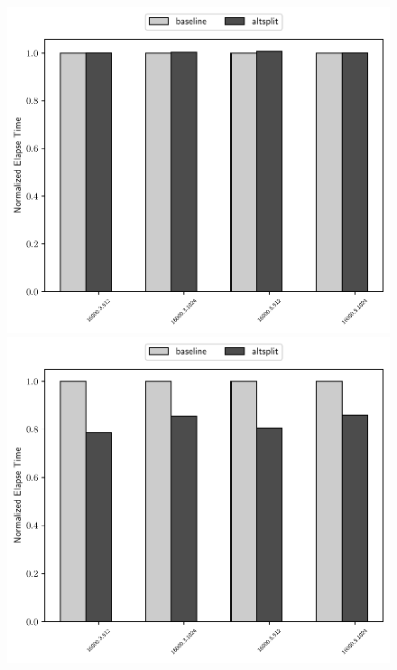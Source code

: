 \begin{figure}[H]
    \centerline{\includegraphics[scale=0.30]{altsplit/figs/mn4/16000_avgs_80.pdf}}
    \centerline{\includegraphics[scale=0.30]{altsplit/figs/mn4/16000_avgs_160.pdf}}

\end{figure}
